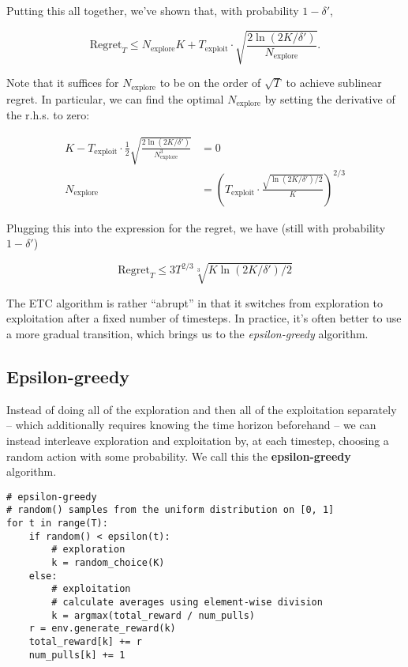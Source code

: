 \documentclass[\main/main]{subfiles}
\begin{document}
Putting this all together, we've shown that, with probability $1 - \delta'$,

\[
    \text{Regret}_T \le N_{\text{explore}} K + T_{\text{exploit}} \cdot \sqrt{\frac{2\ln(2K/\delta')}{N_{\text{explore}}}}.
\]

Note that it suffices for $N_{\text{explore}}$ to be on the order of $\sqrt{T}$ to achieve sublinear regret. In particular, we can find the optimal $N_{\text{explore}}$ by setting the derivative of the r.h.s. to zero:

\begin{align*}
    K - T_{\text{exploit}} \cdot \frac{1}{2} \sqrt{\frac{2\ln(2K/\delta')}{N_{\text{explore}}^3}} &= 0 \\
    N_{\text{explore}} &= \left( T_{\text{exploit}} \cdot \frac{\sqrt{\ln(2K/\delta')/2}}{K} \right)^{2/3}
\end{align*}

Plugging this into the expression for the regret, we have (still with probability $1-\delta'$)

\[
    \text{Regret}_T \le 3 T^{2/3} \sqrt[3]{K \ln(2K/\delta') / 2}
\]

The ETC algorithm is rather ``abrupt'' in that it switches from exploration to exploitation after a fixed number of timesteps. In practice, it's often better to use a more gradual transition, which brings us to the \emph{epsilon-greedy} algorithm.

\subsection{Epsilon-greedy}

Instead of doing all of the exploration and then all of the exploitation separately -- which additionally requires knowing the time horizon beforehand -- we can instead interleave exploration and exploitation by, at each timestep, choosing a random action with some probability. We call this the \textbf{epsilon-greedy} algorithm.

\begin{lstlisting}
# epsilon-greedy
# random() samples from the uniform distribution on [0, 1]
for t in range(T):
    if random() < epsilon(t):
        # exploration
        k = random_choice(K)
    else:
        # exploitation
        # calculate averages using element-wise division
        k = argmax(total_reward / num_pulls)
    r = env.generate_reward(k)
    total_reward[k] += r
    num_pulls[k] += 1
\end{lstlisting}
\end{document}

